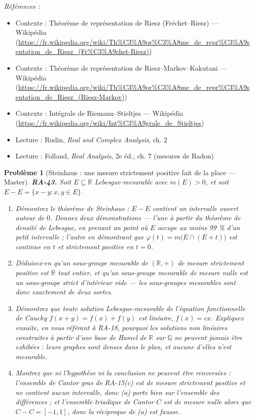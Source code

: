 \documentclass[11pt]{article}
\newtheorem{problem}{Problème}
\newenvironment{refs}{\par\small\noindent\emph{Références :}\begin{itemize}\setlength\itemsep{0pt}}{\end{itemize}\normalsize}
\begin{document}
\begin{refs}
\item Contexte : Théorème de représentation de Riesz (Fréchet--Riesz) --- Wikipédia (\url{https://fr.wikipedia.org/wiki/Th%C3%A9or%C3%A8me_de_repr%C3%A9sentation_de_Riesz_(Fr%C3%A9chet-Riesz)})
\item Contexte : Théorème de représentation de Riesz--Markov--Kakutani --- Wikipédia (\url{https://fr.wikipedia.org/wiki/Th%C3%A9or%C3%A8me_de_repr%C3%A9sentation_de_Riesz_(Riesz-Markov)})
\item Contexte : Intégrale de Riemann--Stieltjes --- Wikipédia (\url{https://fr.wikipedia.org/wiki/Int%C3%A9grale_de_Stieltjes})
\item Lecture : Rudin, \textit{Real and Complex Analysis}, ch. 2
\item Lecture : Folland, \textit{Real Analysis}, 2e éd., ch. 7 (mesures de Radon)
\end{refs}

\bigskip

\begin{problem}[{Steinhaus : une mesure strictement positive fait de la place --- Master}]
\textbf{RA-43.} Soit $ E \subseteq \mathbb{R} $ Lebesgue-mesurable avec
$ m(E) > 0 $, et soit $ E - E = \{ x - y : x, y \in E \} $.
\begin{enumerate}
\item[(a)] Démontrez le théorème de Steinhaus : $ E - E $ contient un intervalle ouvert autour de
$ 0 $. Donnez deux démonstrations --- l'une à partir du théorème de densité de Lebesgue, en prenant
un point où $ E $ occupe au moins 99 \% d'un petit intervalle ; l'autre en démontrant que
$ \varphi(t) = m\big( E \cap (E+t) \big) $ est continue en $ t $ et strictement positive en
$ t = 0 $.
\item[(b)] Déduisez-en qu'un sous-groupe mesurable de $ (\mathbb{R},+) $ de mesure strictement positive
est $ \mathbb{R} $ tout entier, et qu'un sous-groupe mesurable de mesure nulle est un sous-groupe
strict d'intérieur vide --- les sous-groupes mesurables sont donc exactement de deux sortes.
\item[(c)] Démontrez que toute solution Lebesgue-mesurable de l'équation fonctionnelle de Cauchy
$ f(x+y) = f(x)+f(y) $ est linéaire, $ f(x) = cx $. Expliquez ensuite, en vous référant à
RA-18, pourquoi les solutions non linéaires construites à partir d'une base de Hamel de
$ \mathbb{R} $ sur $ \mathbb{Q} $ ne peuvent jamais être exhibées : leurs graphes sont denses
dans le plan, et aucune d'elles n'est mesurable.
\item[(d)] Montrez que ni l'hypothèse ni la conclusion ne peuvent être renversées : l'ensemble de Cantor
gras de RA-15(c) est de mesure strictement positive et ne contient aucun intervalle, donc (a) porte
bien sur l'ensemble des différences ; et l'ensemble triadique de Cantor $ C $ est de mesure nulle
alors que $ C - C = [-1,1] $, donc la réciproque de (a) est fausse.
\end{enumerate}

\end{problem}
\end{document}
